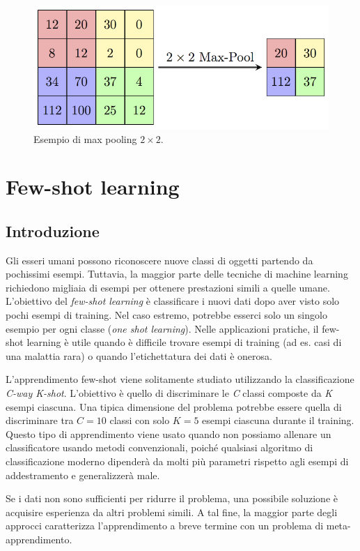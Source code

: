 \documentclass[12pt,a4paper,titlepage]{article}
\begin{document}
\begin{figure}[h]
	\centering	
	\includegraphics[width=.8\textwidth]{Immagini/maxpool}
	\caption{Esempio di max pooling $2 \times 2$.}
	\label{fig:max_pool}
\end{figure}

\clearpage

\section{Few-shot learning}
\label{sec:few-shot}
\subsection{Introduzione}
Gli esseri umani possono riconoscere nuove classi di oggetti partendo da pochissimi esempi. Tuttavia, la maggior parte delle tecniche di machine learning richiedono migliaia di esempi per ottenere prestazioni simili a quelle umane. L'obiettivo del \textit{few-shot learning} è classificare i nuovi dati dopo aver visto solo pochi esempi di training. Nel caso estremo, potrebbe esserci solo un singolo esempio per ogni classe (\textit{one shot learning}). Nelle applicazioni pratiche, il few-shot learning è utile quando è difficile trovare esempi di training (ad es. casi di una malattia rara) o quando l'etichettatura dei dati è onerosa.

L'apprendimento few-shot viene solitamente studiato utilizzando la classificazione \textit{C-way K-shot}. L'obiettivo è quello di discriminare le \textit{C} classi composte da \textit{K} esempi ciascuna. Una tipica dimensione del problema potrebbe essere quella di discriminare tra $C=10$ classi con solo $K=5$ esempi ciascuna durante il training. Questo tipo di apprendimento viene usato quando non possiamo allenare un classificatore usando metodi convenzionali, poiché qualsiasi algoritmo di classificazione moderno dipenderà da molti più parametri rispetto agli esempi di addestramento e generalizzerà male.

Se i dati non sono sufficienti per ridurre il problema, una possibile soluzione è acquisire esperienza da altri problemi simili. A tal fine, la maggior parte degli approcci caratterizza l'apprendimento a breve termine con un problema di meta-apprendimento.
\end{document}
